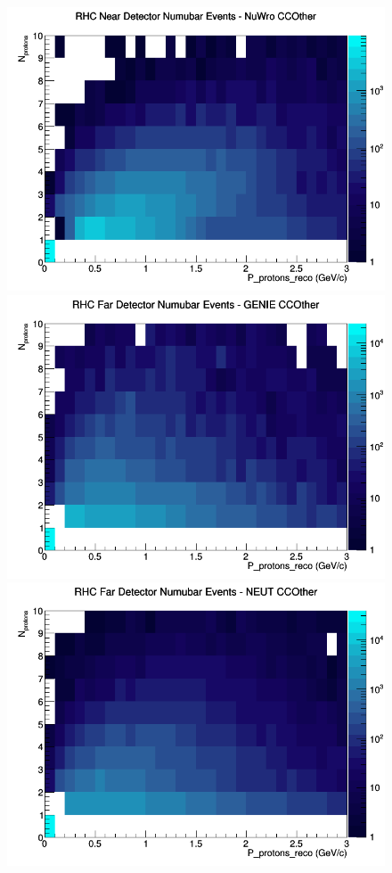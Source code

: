 \begin{figure}[h]
\includegraphics[width=\linewidth]{eff_N_P/FGT/protons/CCOther_RHC_ND_numubar_N_P_NuWro.png}
\endminipage
\newline
{}
\includegraphics[width=\linewidth]{eff_N_P/FGT/protons/CCOther_RHC_FD_numubar_N_P_GENIE.png}
\endminipage
{}
\includegraphics[width=\linewidth]{eff_N_P/FGT/protons/CCOther_RHC_FD_numubar_N_P_NEUT.png}

\end{figure}
